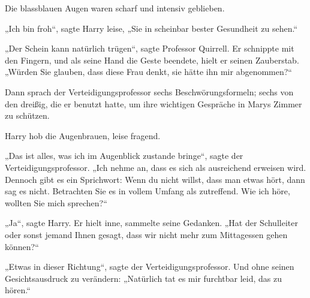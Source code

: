Die blassblauen Augen waren scharf und intensiv geblieben.

„Ich bin froh“, sagte Harry leise,
„Sie in scheinbar bester Gesundheit zu sehen.“

„Der Schein kann natürlich trügen“, sagte Professor Quirrell. Er schnippte mit den Fingern, und als seine Hand die Geste beendete, hielt er seinen Zauberstab.
„Würden Sie glauben, dass diese Frau denkt, sie hätte ihn mir abgenommen?“

Dann sprach der Verteidigungsprofessor sechs Beschwörungsformeln; sechs von den dreißig, die er benutzt hatte, um ihre wichtigen Gespräche in Marys Zimmer zu schützen.

Harry hob die Augenbrauen, leise fragend.

„Das ist alles, was ich im Augenblick zustande bringe“, sagte der Verteidigungsprofessor.
„Ich nehme an, dass es sich als ausreichend erweisen wird. Dennoch gibt es ein Sprichwort: Wenn du nicht willst, dass man etwas hört, dann sag es nicht. Betrachten Sie es in vollem Umfang als zutreffend. Wie ich höre, wollten Sie mich sprechen?“

„Ja“, sagte Harry. Er hielt inne, sammelte seine Gedanken.
„Hat der Schulleiter oder sonst jemand Ihnen gesagt, dass wir nicht mehr zum Mittagessen gehen können?“

„Etwas in dieser Richtung“, sagte der Verteidigungsprofessor. Und ohne seinen Gesichtsausdruck zu verändern:
„Natürlich tat es mir furchtbar leid, das zu hören.“

